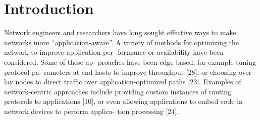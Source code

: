 \documentclass[runningheads,a4paper]{llncs}
\begin{document}
\section{Introduction}
Network engineers and researchers have long sought effective ways to make networks more “application-aware”. A variety of methods for optimizing the network to improve application per- formance or availability have been considered. Some of these ap- proaches have been edge-based, for example tuning protocol pa- rameters at end-hosts to improve throughput [28], or choosing over- lay nodes to direct traffic over application-optimized paths [23]. Examples of network-centric approaches include providing custom instances of routing protocols to applications [10], or even allowing applications to embed code in network devices to perform applica- tion processing [24].
\end{document}
